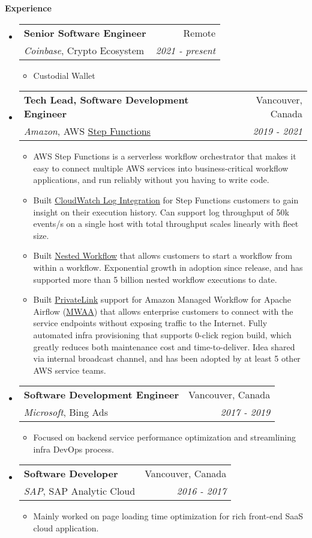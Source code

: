 \documentclass[letterpaper,10pt]{article}
\makeatletter
\newcommand{\resitem}[1]{\item #1 \vspace{-2pt}}
\newcommand{\resheading}[1]{{\large \colorbox{mygrey}{\begin{minipage}{\textwidth}{\textbf{#1 \vphantom{p\^{E}}}}\end{minipage}}}}
\newcommand{\ressubheading}[4]{
\begin{tabular*}{7.0in}{l@{\extracolsep{\fill}}r}
    \textbf{#1} & #2 \\
    #3 & \textit{#4} \\
\end{tabular*}\vspace{-6pt}}
\makeatother
\begin{document}
\resheading{Experience}
\begin{itemize}
\itemsep0em
\item
    \ressubheading{Senior Software Engineer}{Remote}{\textit{Coinbase}, Crypto Ecosystem}{2021 - present}
    \begin{itemize}
        \resitem{Custodial Wallet}
	\end{itemize}
\item
    \ressubheading{Tech Lead, Software Development Engineer}{Vancouver, Canada}{\textit{Amazon}, AWS \href{https://aws.amazon.com/step-functions/}{Step Functions}}{2019 - 2021}
    \begin{itemize}
        \resitem{AWS Step Functions is a serverless workflow orchestrator that makes it easy to connect multiple AWS services into business-critical workflow applications, and run reliably without you having to write code. }
        \resitem{Built \href{https://docs.aws.amazon.com/step-functions/latest/dg/cw-logs.html}{CloudWatch Log Integration} for Step Functions customers to gain insight on their execution history. Can support log throughput of 50k events/s on a single host with total throughput scales linearly with fleet size. }
        \resitem{Built \href{https://aws.amazon.com/about-aws/whats-new/2019/08/aws-step-function-adds-support-for-nested-workflows/}{Nested Workflow} that allows customers to start a workflow from within a workflow. Exponential growth in adoption since release, and has supported more than 5 billion nested workflow executions to date. }
        \resitem{Built \href{https://aws.amazon.com/privatelink/}{PrivateLink} support for Amazon Managed Workflow for Apache Airflow (\href{https://docs.aws.amazon.com/mwaa/index.html}{MWAA}) that allows enterprise customers to connect with the service endpoints without exposing traffic to the Internet. Fully automated infra provisioning that supports 0-click region build, which greatly reduces both maintenance cost and time-to-deliver. Idea shared via internal broadcast channel, and has been adopted by at least 5 other AWS service teams. }
	\end{itemize}
\item
    \ressubheading{Software Development Engineer}{Vancouver, Canada}{\textit{Microsoft}, Bing Ads}{2017 - 2019}
    \begin{itemize}
        \resitem{Focused on backend service performance optimization and streamlining infra DevOps process.}
	\end{itemize}
\item
    \ressubheading{Software Developer}{Vancouver, Canada}{\textit{SAP}, SAP Analytic Cloud}{2016 - 2017}
    \begin{itemize}
        \resitem{Mainly worked on page loading time optimization for rich front-end SaaS cloud application.}
    \end{itemize}
\end{itemize}
\end{document}
